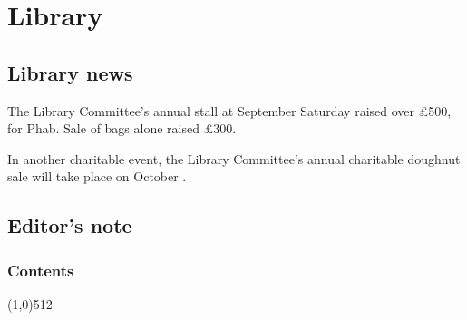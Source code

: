 \documentclass[11pt,a4paper]{report}
\let\origsection\subsection
\renewcommand{\subsection}[1]{\origsection{#1}\vspace{-0.5em}\line(1,0){512}\vspace{-1em}}
\begin{document}
	
	
	
	\tableofcontents
	
	\chapter{Library}
	\setlength{\parindent}{0em}
	\setlength{\parskip}{1.25em}
	
	\section{Library news}
	
	\begin{multicols}{2}
		
		The Library Committee's annual stall at September Saturday raised over £500, for Phab. Sale of bags alone raised £300. 
		
		In another charitable event, the Library Committee's annual charitable doughnut sale will take place on October .
		
	\end{multicols}
	
	\section{Editor's note}
	
	\subsection{Contents}
	
\end{document}
